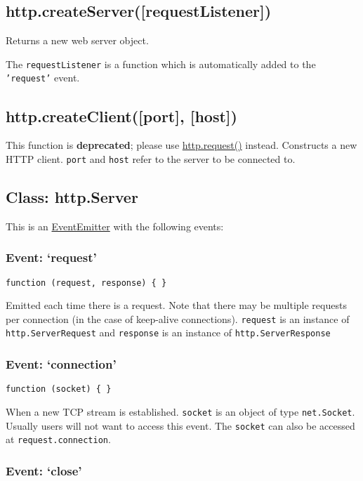 \subsection{http.createServer({[}requestListener{]})}

Returns a new web server object.

The \texttt{requestListener} is a function which is automatically added
to the \texttt{'request'} event.

\subsection{http.createClient({[}port{]}, {[}host{]})}

This function is \textbf{deprecated}; please use
\hyperref[http_http_request_options_callback]{http.request()}
instead. Constructs a new HTTP client. \texttt{port} and \texttt{host}
refer to the server to be connected to.

\subsection{Class: http.Server}

This is an
\href{events.html\#events\_class\_events\_eventemitter}{EventEmitter}
with the following events:

\subsubsection{Event: `request'}

\texttt{function (request, response) \{ \}}

Emitted each time there is a request. Note that there may be multiple
requests per connection (in the case of keep-alive connections).
\texttt{request} is an instance of \texttt{http.ServerRequest} and
\texttt{response} is an instance of \texttt{http.ServerResponse}

\subsubsection{Event: `connection'}

\texttt{function (socket) \{ \}}

When a new TCP stream is established. \texttt{socket} is an object of
type \texttt{net.Socket}. Usually users will not want to access this
event. The \texttt{socket} can also be accessed at
\texttt{request.connection}.

\subsubsection{Event: `close'}

